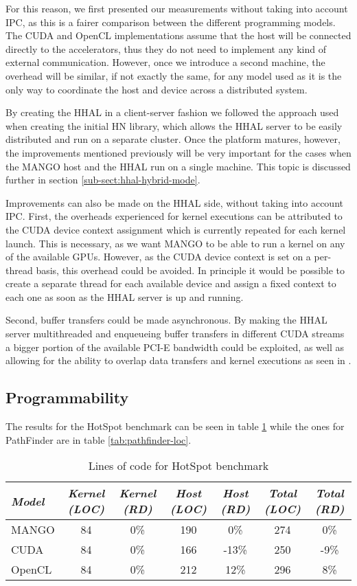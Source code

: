 For this reason, we first presented our measurements without taking into account IPC, as this is a fairer comparison between the different programming models. The CUDA and OpenCL implementations assume that the host will be connected directly to the accelerators, thus they do not need to implement any kind of external communication. However, once we introduce a second machine, the overhead will be similar, if not exactly the same, for any model used as it is the only way to coordinate the host and device across a distributed system.

By creating the HHAL in a client-server fashion we followed the approach used when creating the initial HN library, which allows the HHAL server to be easily distributed and run on a separate cluster. Once the platform matures, however, the improvements mentioned previously will be very important for the cases when the MANGO host and the HHAL run on a single machine. This topic is discussed further in section \ref{sub-sect:hhal-hybrid-mode}.

Improvements can also be made on the HHAL side, without taking into account IPC. First, the overheads experienced for kernel executions can be attributed to the CUDA device context assignment which is currently repeated for each kernel launch. This is necessary, as we want MANGO to be able to run a kernel on any of the available GPUs. However, as the CUDA device context is set on a per-thread basis, this overhead could be avoided. In principle it would be possible to create a separate thread for each available device and assign a fixed context to each one as soon as the HHAL server is up and running.

Second, buffer transfers could be made asynchronous. By making the HHAL server multithreaded and enqueueing buffer transfers in different CUDA streams a bigger portion of the available PCI-E bandwidth could be exploited, as well as allowing for the ability to overlap data transfers and kernel executions as seen in \cite{overlap-data-transfers-cuda}.

\subsection{Programmability}

The results for the HotSpot benchmark can be seen in table \ref{tab:hotspot-loc} while the ones for PathFinder are in table \ref{tab:pathfinder-loc}.

\begin{table}
    \centering
    \begin{tabular}{l|c|c|c|c|c|c}
    \textit{Model} & \textit{Kernel (LOC)} & \textit{Kernel (RD)} & \textit{Host (LOC)} & \textit{Host (RD)} & \textit{Total (LOC)} & \textit{Total (RD)} \\ \hline
    MANGO & 84 & 0\% & 190 & 0\% & 274 & 0\% \\
    CUDA & 84 & 0\% & 166 & -13\% & 250 & -9\% \\
    OpenCL & 84 & 0\% & 212 & 12\% & 296 & 8\%  
    \end{tabular}
    \captionsetup{justification=centering}
    \caption{Lines of code for HotSpot benchmark}
    \label{tab:hotspot-loc}
\end{table}

